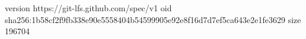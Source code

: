 version https://git-lfs.github.com/spec/v1
oid sha256:1b58cf2f9fb338e90e5558404b54599905e92e8f16d7d7ef5ca643e2e1fe3629
size 196704
